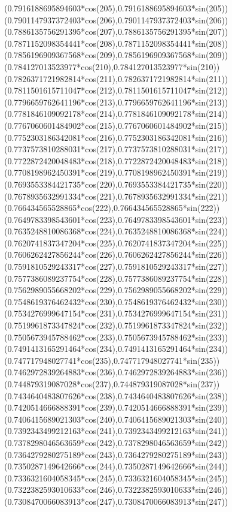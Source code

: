 {({0.7916188695894603*cos(205)},{0.7916188695894603*sin(205)})
({0.7901147937372403*cos(206)},{0.7901147937372403*sin(206)})
({0.7886135756291395*cos(207)},{0.7886135756291395*sin(207)})
({0.7871152098354441*cos(208)},{0.7871152098354441*sin(208)})
({0.7856196909367568*cos(209)},{0.7856196909367568*sin(209)})
({0.784127013523977*cos(210)},{0.784127013523977*sin(210)})
({0.7826371721982814*cos(211)},{0.7826371721982814*sin(211)})
({0.7811501615711047*cos(212)},{0.7811501615711047*sin(212)})
({0.7796659762641196*cos(213)},{0.7796659762641196*sin(213)})
({0.7781846109092178*cos(214)},{0.7781846109092178*sin(214)})
({0.7767060601484902*cos(215)},{0.7767060601484902*sin(215)})
({0.7752303186342081*cos(216)},{0.7752303186342081*sin(216)})
({0.7737573810288031*cos(217)},{0.7737573810288031*sin(217)})
({0.7722872420048483*cos(218)},{0.7722872420048483*sin(218)})
({0.7708198962450391*cos(219)},{0.7708198962450391*sin(219)})
({0.7693553384421735*cos(220)},{0.7693553384421735*sin(220)})
({0.7678935632991334*cos(221)},{0.7678935632991334*sin(221)})
({0.766434565528865*cos(222)},{0.766434565528865*sin(222)})
({0.7649783398543601*cos(223)},{0.7649783398543601*sin(223)})
({0.7635248810086368*cos(224)},{0.7635248810086368*sin(224)})
({0.7620741837347204*cos(225)},{0.7620741837347204*sin(225)})
({0.7606262427856244*cos(226)},{0.7606262427856244*sin(226)})
({0.7591810529243317*cos(227)},{0.7591810529243317*sin(227)})
({0.7577386089237754*cos(228)},{0.7577386089237754*sin(228)})
({0.7562989055668202*cos(229)},{0.7562989055668202*sin(229)})
({0.7548619376462432*cos(230)},{0.7548619376462432*sin(230)})
({0.7534276999647154*cos(231)},{0.7534276999647154*sin(231)})
({0.7519961873347824*cos(232)},{0.7519961873347824*sin(232)})
({0.7505673945788462*cos(233)},{0.7505673945788462*sin(233)})
({0.7491413165291464*cos(234)},{0.7491413165291464*sin(234)})
({0.747717948027741*cos(235)},{0.747717948027741*sin(235)})
({0.7462972839264883*cos(236)},{0.7462972839264883*sin(236)})
({0.744879319087028*cos(237)},{0.744879319087028*sin(237)})
({0.7434640483807626*cos(238)},{0.7434640483807626*sin(238)})
({0.7420514666888391*cos(239)},{0.7420514666888391*sin(239)})
({0.7406415689021303*cos(240)},{0.7406415689021303*sin(240)})
({0.7392343499212163*cos(241)},{0.7392343499212163*sin(241)})
({0.7378298046563659*cos(242)},{0.7378298046563659*sin(242)})
({0.7364279280275189*cos(243)},{0.7364279280275189*sin(243)})
({0.7350287149642666*cos(244)},{0.7350287149642666*sin(244)})
({0.7336321604058345*cos(245)},{0.7336321604058345*sin(245)})
({0.7322382593010633*cos(246)},{0.7322382593010633*sin(246)})
({0.7308470066083913*cos(247)},{0.7308470066083913*sin(247)})
}
